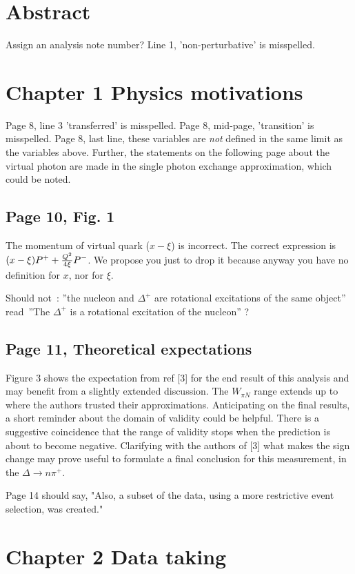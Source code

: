 \documentclass[11pt]{paper}
\begin{document}
\newpage

\section*{Abstract}
Assign an analysis note number?
Line 1, 'non-perturbative' is misspelled.

\section*{Chapter 1 Physics motivations}
Page 8, line 3 'transferred' is misspelled.
Page 8, mid-page, 'transition' is misspelled.
Page 8, last line, these variables are {\em{not}} defined in the same limit as the variables above. Further, the statements on the following page about the virtual photon are made in the single photon exchange approximation, which could be noted. 
\subsection*{Page 10, Fig. 1}

The momentum of virtual quark ($x-\xi$) is incorrect. The correct expression
is $(x-\xi)P^+ + {{Q^2}\over{4\xi}}  P^-$. We propose you just to drop it because anyway you have no definition for $x$, nor for $\xi$.

Should not~: ''the nucleon and $\Delta^+$ are rotational excitations of the same object''
read~''The $\Delta^+$ is a rotational excitation of the nucleon'' ?

\subsection*{Page 11, Theoretical expectations}
Figure 3 shows the expectation from ref [3] for the end result of this analysis and may benefit from a slightly extended discussion.
The $W_{\pi N} $ range extends up to where the authors trusted their approximations.
Anticipating on the final results, a short reminder about the domain of validity could be helpful.
There is a suggestive coincidence that the range of validity stops when the prediction is about to become negative.
Clarifying with the authors of [3] what makes the sign change may prove useful to formulate a final conclusion for this measurement, in the $\Delta\rightarrow n\pi^+$.

Page 14 should say, "Also, a subset of the data, using a more restrictive event selection, was created."

\section*{Chapter 2 Data taking}
\end{document}
